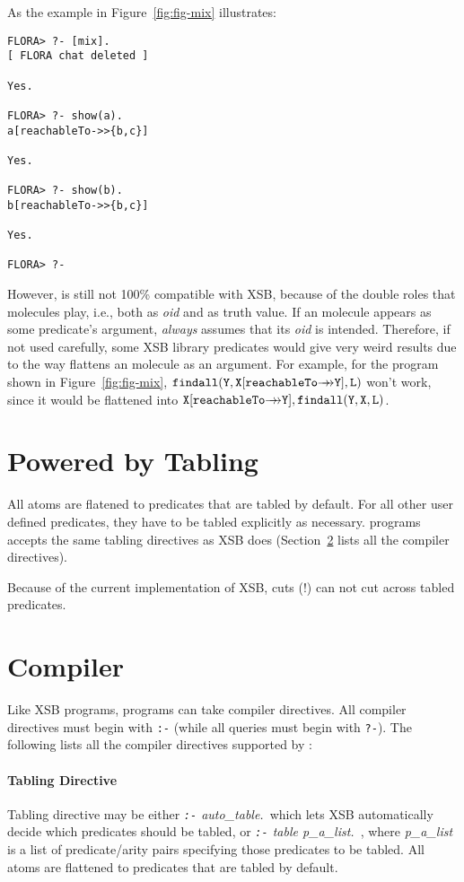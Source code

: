 \documentclass[11pt]{report}
\begin{document}
As the example in Figure~\ref{fig:fig-mix} illustrates:
\begin{verbatim}
FLORA> ?- [mix].
[ FLORA chat deleted ]

Yes.

FLORA> ?- show(a).
a[reachableTo->>{b,c}]

Yes.

FLORA> ?- show(b).
b[reachableTo->>{b,c}]

Yes.

FLORA> ?-
\end{verbatim}

However, \FLORA is still not 100\% compatible with XSB, because of the double roles that
\mbox{\fl} molecules play, i.e., both as \emph{oid} and as truth value. If an \fl molecule
appears as some predicate's argument, \FLORA \emph{always} assumes that its \emph{oid} is
intended. Therefore, if not used carefully, some XSB library predicates would give very
weird results due to the way \FLORA flattens an \fl molecule as an argument. For
example, for the \FLORA program shown in Figure~\ref{fig:fig-mix},
$\mathtt{findall(Y,X[reachableTo{{\rightarrow\!\!\!\!\rightarrow}}Y],L)}$ won't work, since it would be flattened
into \linebreak $\mathtt{X[reachableTo{{\rightarrow\!\!\!\!\rightarrow}}Y],findall(Y,X,L)}$.

\section{Powered by Tabling}

All \fl atoms are flatened to predicates that are tabled by default. For all other user
defined predicates, they have to be tabled explicitly as necessary. \FLORA programs accepts
the same tabling directives as XSB does (Section~\ref{sec-comp-directives} lists all the
compiler directives).

Because of the current implementation of XSB, cuts (!) can not cut across tabled predicates.

\section{\FLORA Compiler} \label{sec-comp-directives}

Like XSB programs, \FLORA programs can take compiler directives. All compiler directives must
begin with {\tt :-} (while all queries must begin with {\tt ?-}). The following lists all the
compiler directives supported by \FLORA:

\paragraph{Tabling Directive} Tabling directive may be either \emph{{\tt :-} auto\_table.}\ 
which lets XSB automatically decide which predicates should be tabled, or
\emph{{\tt :-} table p\_a\_list.}\ , where \emph{p\_a\_list} is a list of \mbox{predicate/arity}
pairs specifying those predicates to be tabled. All \fl atoms are flattened to predicates that
are tabled by default.
\end{document}

